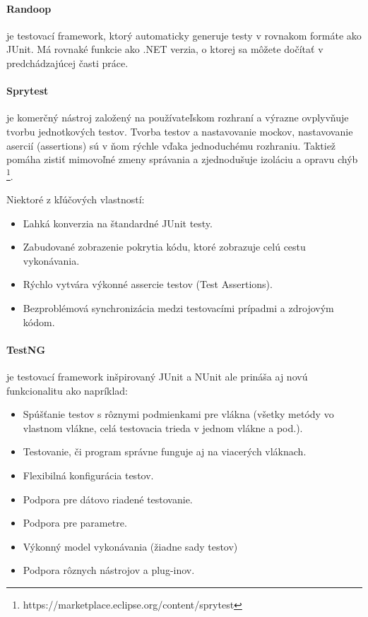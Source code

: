 \documentclass[11pt,twoside,slovak,a4paper]{article}
\begin{document}
		\paragraph{Randoop} je testovací framework, ktorý automaticky generuje testy v rovnakom formáte ako JUnit. Má rovnaké funkcie ako .NET verzia, o ktorej sa môžete dočítať v predchádzajúcej časti práce.
		
		\paragraph{Sprytest} je komerčný nástroj založený na používateľskom rozhraní a výrazne ovplyvňuje tvorbu jednotkových testov. Tvorba testov a nastavovanie mockov, nastavovanie asercií (assertions) sú v ňom rýchle vďaka jednoduchému rozhraniu. Taktiež pomáha zistiť mimovoľné zmeny správania a zjednodušuje izoláciu a opravu chýb \footnote{https://marketplace.eclipse.org/content/sprytest}.
		
		Niektoré z kľúčových vlastností:
		\begin{itemize}
			\item Ľahká konverzia na štandardné JUnit testy.
			\item Zabudované zobrazenie pokrytia kódu, ktoré zobrazuje celú cestu vykonávania.
			\item Rýchlo vytvára výkonné assercie testov (Test Assertions).
			\item Bezproblémová synchronizácia medzi testovacími prípadmi a zdrojovým kódom.
		\end{itemize}

		\paragraph{TestNG} je testovací framework inšpirovaný JUnit a NUnit ale prináša aj novú funkcionalitu ako napríklad:
		\begin{itemize}
			\item Spúšťanie testov s rôznymi podmienkami pre vlákna (všetky metódy vo vlastnom vlákne, celá testovacia trieda v jednom vlákne a pod.).
			\item Testovanie, či program správne funguje aj na viacerých vláknach.
			\item Flexibilná konfigurácia testov.
			\item Podpora pre dátovo riadené testovanie.
			\item Podpora pre parametre.
			\item Výkonný model vykonávania (žiadne sady testov)
			\item Podpora rôznych nástrojov a plug-inov.
		\end{itemize}
		
\end{document}
